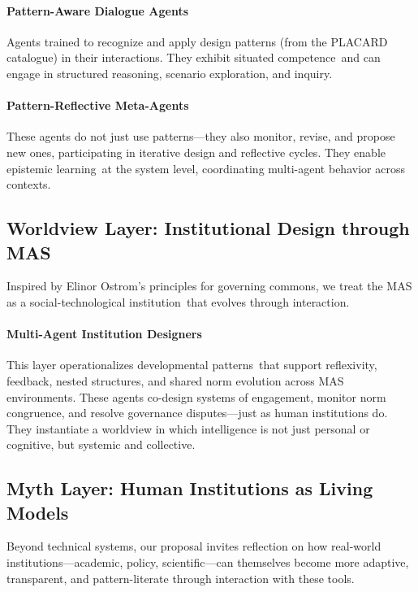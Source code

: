 \documentclass[acmlarge,timestamp]{acmart}
\begin{document}
{\paragraph{Pattern-Aware Dialogue Agents}

Agents trained to recognize and apply design patterns (from the
PLACARD catalogue) in their interactions. They exhibit situated
competence~and can engage in structured reasoning, scenario
exploration, and inquiry.

\paragraph{Pattern-Reflective Meta-Agents}

These agents do not just use patterns---they also monitor, revise, and
propose new ones, participating in iterative design and reflective
cycles. They enable epistemic learning~at the system level,
coordinating multi-agent behavior across contexts.

\subsection*{ Worldview Layer: Institutional Design through MAS}

Inspired by Elinor Ostrom's principles for governing commons, we treat
the MAS as a social-technological institution~that evolves through
interaction.

\paragraph{Multi-Agent Institution Designers}

This layer operationalizes developmental patterns~that support
reflexivity, feedback, nested structures, and shared norm evolution
across MAS environments. These agents co-design systems of engagement,
monitor norm congruence, and resolve governance disputes---just as
human institutions do. They instantiate a worldview in which
intelligence is not just personal or cognitive, but systemic and
collective.

\subsection*{ Myth Layer: Human Institutions as Living Models}

Beyond technical systems, our proposal invites reflection on how
real-world institutions---academic, policy, scientific---can
themselves become more adaptive, transparent, and pattern-literate
through interaction with these tools.

}
\end{document}
